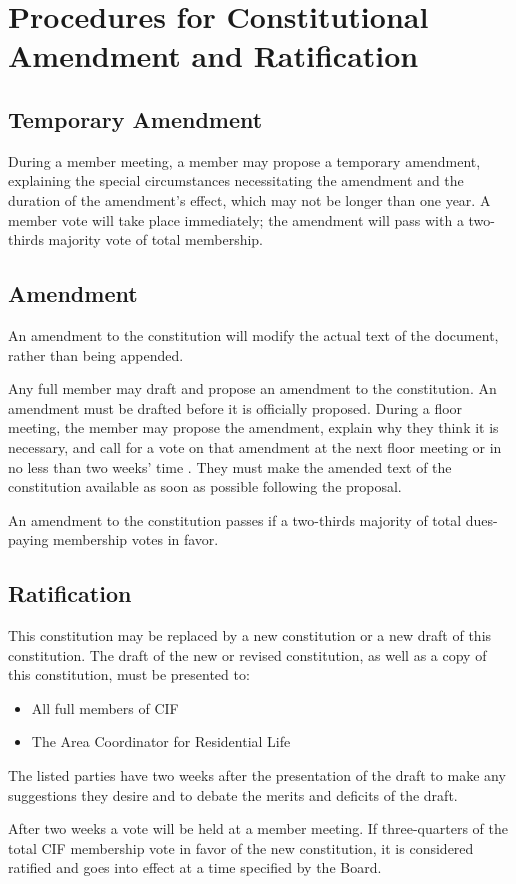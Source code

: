 \section {Procedures for Constitutional Amendment and Ratification}
\label{sec:amendment-and-ratification}



	\subsection {Temporary Amendment}

During a member meeting, a member may propose a temporary amendment, explaining the special circumstances necessitating the amendment and the duration of the amendment's effect, which may not be longer than one year. A member vote will take place immediately; the amendment will pass with a two-thirds majority vote of total membership.



	\subsection {Amendment}

An amendment to the constitution will modify the actual text of the document, rather than being appended.

Any full member may draft and propose an amendment to the constitution. An amendment must be drafted before it is officially proposed. During a floor meeting, the member may propose the amendment, explain why they think it is necessary, and call for a vote on that amendment at the next floor meeting or in no less than two weeks' time	. They must make the amended text of the constitution available as soon as possible following the proposal.

An amendment to the constitution passes if a two-thirds majority of total dues-paying membership votes in favor.



	\subsection {Ratification}

This constitution may be replaced by a new constitution or a new draft of this constitution. The draft of the new or revised constitution, as well as a copy of this constitution, must be presented to:
\begin{itemize}
	\item All full members of CIF
	\item The Area Coordinator for Residential Life
\end{itemize}
The listed parties have two weeks after the presentation of the draft to make any suggestions they desire and to debate the merits and deficits of the draft.

After two weeks a vote will be held at a member meeting. If three-quarters of the total CIF membership vote in favor of the new constitution, it is considered ratified and goes into effect at a time specified by the Board.
